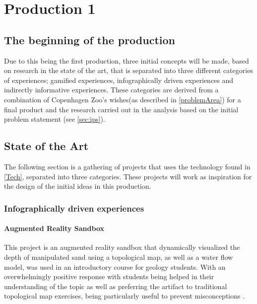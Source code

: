 \chapter{Production 1}

\section{The beginning of the production}
    Due to this being the first production, three initial concepts will be made, based on research in the state of the art, that is separated into three different categories of experiences; gamified experiences, infographically driven experiences and indirectly informative experiences. These categories are derived from a combination of Copenhagen Zoo's wishes(as described in \autoref{problemArea}) for a final product and the research carried out in the analysis based on the initial problem statement (see \autoref{sec:ips}).
    

\section{State of the Art}
    The following section is a gathering of projects that uses the technology found in \autoref{Tech}, separated into three categories. These projects will work as inspiration for the design of the initial ideas in this production.
    
    \subsection{Infographically driven experiences}
    
	    \subsubsection{Augmented Reality Sandbox} %
    	    This project is an augmented reality sandbox that dynamically visualized the depth of manipulated sand using a topological map, as well as a water flow model, was used in an introductory course for geology students. With an overwhelmingly positive response with students being helped in their understanding of the topic as well as preferring the artifact to traditional topological map exercises, being particularly useful to prevent misconceptions \cite{woods2016pilot}.
    
